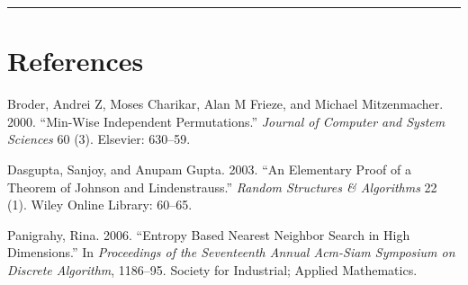 \documentclass[20pt,]{extarticle}
\begin{document}
\begin{center}\rule{0.5\linewidth}{\linethickness}\end{center}

\section*{References}\label{references}

\hypertarget{refs}{}
\hypertarget{ref-broder2000min}{}
Broder, Andrei Z, Moses Charikar, Alan M Frieze, and Michael
Mitzenmacher. 2000. ``Min-Wise Independent Permutations.'' \emph{Journal
of Computer and System Sciences} 60 (3). Elsevier: 630--59.

\hypertarget{ref-dasgupta2003elementary}{}
Dasgupta, Sanjoy, and Anupam Gupta. 2003. ``An Elementary Proof of a
Theorem of Johnson and Lindenstrauss.'' \emph{Random Structures \&
Algorithms} 22 (1). Wiley Online Library: 60--65.

\hypertarget{ref-panigrahy2006entropy}{}
Panigrahy, Rina. 2006. ``Entropy Based Nearest Neighbor Search in High
Dimensions.'' In \emph{Proceedings of the Seventeenth Annual Acm-Siam
Symposium on Discrete Algorithm}, 1186--95. Society for Industrial;
Applied Mathematics.
\end{document}
